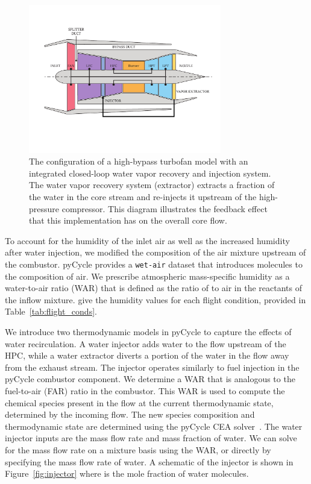 \documentclass[conf]{new-aiaa}
\begin{document}
\begin{figure}[hbt!]
  \centering
  \includegraphics[width=0.75\textwidth]{turbofan_wvr.pdf}
  \caption{
    The configuration of a high-bypass turbofan model with an integrated closed-loop water vapor recovery and injection system.
    The water vapor recovery system (extractor) extracts a fraction of the water in the core stream and re-injects it upstream of the high-pressure compressor.
    This diagram illustrates the feedback effect that this implementation has on the overall core flow.}
  \label{fig:n3_cycle}
\end{figure}

To account for the humidity of the inlet air as well as the increased humidity after water injection, we modified the composition of the air mixture upstream of the combustor.
pyCycle provides a \texttt{wet-air} dataset that introduces  molecules to the composition of air.
We prescribe atmospheric mass-specific humidity as a water-to-air ratio (WAR) that is defined as the ratio of  to air in the reactants of the inflow mixture.
\citet{Kalnay1996} give the humidity values for each flight condition, provided in Table~\ref{tab:flight_conds}.

We introduce two thermodynamic models in pyCycle to capture the effects of water recirculation.
A water injector adds water to the flow upstream of the HPC, while a water extractor diverts a portion of the water in the flow away from the exhaust stream.
The injector operates similarly to fuel injection in the pyCycle combustor component.
We determine a WAR that is analogous to the fuel-to-air (FAR) ratio in the combustor.
This WAR is used to compute the chemical species present in the flow at the current thermodynamic state, determined by the incoming flow.
The new species composition and thermodynamic state are determined using the pyCycle CEA solver~\cite{Gray2017b}.
The water injector inputs are the mass flow rate and mass fraction of water.
We can solve for the mass flow rate on a mixture basis using the WAR, or directly by specifying the mass flow rate of water.
A schematic of the injector is shown in Figure~\ref{fig:injector} where  is the mole fraction of water molecules.
\end{document}
